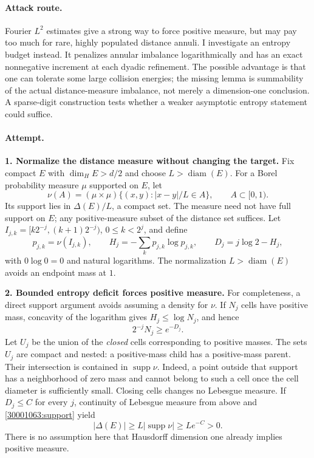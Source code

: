 \documentclass[11pt,a4paper]{article}
\begin{document}
\paragraph{Attack route.}
Fourier $L^2$ estimates give a strong way to force positive measure, but may
pay too much for rare, highly populated distance annuli. I investigate an
entropy budget instead. It penalizes annular imbalance logarithmically and
has an exact nonnegative increment at each dyadic refinement. The possible
advantage is that one can tolerate some large collision energies; the
missing lemma is summability of the actual distance-measure imbalance,
not merely a dimension-one conclusion. A sparse-digit construction tests
whether a weaker asymptotic entropy statement could suffice.

\paragraph{Attempt.}
\textbf{1. Normalize the distance measure without changing the target.}
Fix compact $E$ with $\dim_H E>d/2$ and choose $L>\operatorname{diam}(E)$.
For a Borel probability measure $\mu$ supported on $E$, let
\[
 \nu(A)=(\mu\times\mu)\{(x,y): |x-y|/L\in A\},\qquad A\subset[0,1).
\]
Its support lies in $\Delta(E)/L$, a compact set. The measure need not have
full support on $E$; any positive-measure subset of the distance set suffices.
Let $I_{j,k}=[k2^{-j},(k+1)2^{-j})$, $0\le k<2^j$, and define
\[
 p_{j,k}=\nu(I_{j,k}),\qquad
 H_j=-\sum_k p_{j,k}\log p_{j,k},\qquad
 D_j=j\log2-H_j,
\]
with $0\log0=0$ and natural logarithms. The normalization $L>\operatorname{diam}(E)$
avoids an endpoint mass at $1$.

\textbf{2. Bounded entropy deficit forces positive measure.}
For completeness, a direct support argument avoids assuming a density for
$\nu$. If $N_j$ cells have positive mass, concavity of the logarithm gives
$H_j\le\log N_j$, and hence
\begin{equation}\label{30001063:support}
 2^{-j}N_j\ge e^{-D_j}.
\end{equation}
Let $U_j$ be the union of the \emph{closed} cells corresponding to positive
masses. The sets $U_j$ are compact and nested: a positive-mass child has a
positive-mass parent. Their intersection is contained in $\operatorname{supp}\nu$.
Indeed, a point outside that support has a neighborhood of zero mass and
cannot belong to such a cell once the cell diameter is sufficiently small.
Closing cells changes no Lebesgue measure. If $D_j\le C$ for every $j$,
continuity of Lebesgue measure from above and \eqref{30001063:support} yield
\begin{equation}\label{30001063:positive}
 |\Delta(E)|\ge L|\operatorname{supp}\nu|\ge Le^{-C}>0.
\end{equation}
There is no assumption here that Hausdorff dimension one already implies
positive measure.
\end{document}
